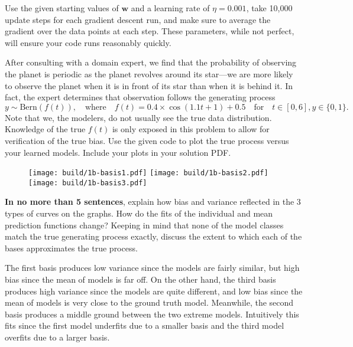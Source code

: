 \documentclass[expanded]{lkx_pset}
\begin{document}
\begin{parts}
	\pagebreak
	\begin{part}{}
		Use the given starting values of $\bm{w}$ and a learning rate of $\eta=0.001$, take 10,000 update
		steps for each gradient descent run, and make sure to average the
		gradient over the data points at each step. These parameters,
		while not perfect, will ensure your code runs reasonably quickly.
	\end{part}

	\begin{part}{2}
		After consulting with a domain expert, we find that the probability of observing the planet is periodic as the planet revolves around its star---we are more likely to observe the planet when it is in front of its star than when it is behind it. In fact, the expert determines that observation follows the generating process \[y \sim \text{Bern}(f(t)), \quad\textrm{where}\quad f(t) = 0.4 \times \cos(1.1t + 1) + 0.5\quad\textrm{for} \quad t \in [0, 6], y \in \{0,1\}.\] Note that we, the modelers, do not usually see the true data distribution. Knowledge of the true $f(t)$ is only exposed in this problem to allow for verification of the true bias.
		Use the given code to plot the true process versus your learned models. Include your plots in your solution PDF.
	\end{part}

	\begin{figure}[ht]
		\centering
		\texttt{[image: build/1b-basis1.pdf]}
		\texttt{[image: build/1b-basis2.pdf]}
		\texttt{[image: build/1b-basis3.pdf]}
	\end{figure}\noindent

	\begin{part}{}
		\textbf{In no more than 5 sentences}, explain how bias and variance reflected in the 3 types of curves on the graphs.  How do the fits of the individual and mean prediction functions change?  Keeping in mind that none of the model classes match the true generating process exactly, discuss the extent to which each of the bases approximates the true process.
	\end{part}

	The first basis produces low variance since the models are fairly similar, but high bias since the mean of models is far off. On the other hand, the third basis produces high variance since the models are quite different, and low bias since the mean of models is very close to the ground truth model. Meanwhile, the second basis produces a middle ground between the two extreme models. Intuitively this fits since the first model underfits due to a smaller basis and the third model overfits due to a larger basis.


\end{parts}
\end{document}
